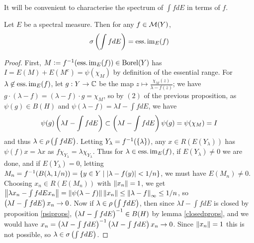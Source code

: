 \documentclass[10pt]{amsart}
\begin{document}
It will be convenient to characterise the spectrum of $\int f dE$ in terms of $f$. %
\begin{proposition}\label{essimspec} %
    Let $E$ be a spectral measure. Then for any $f \in \mathcal{M}(Y)$,
    $$
        \sigma\left(  \int f dE  \right) = \operatorname{ess.im}_E(f)
    $$
\end{proposition}
\begin{proof}
    First, $M \vcentcolon= f^{-1}(\operatorname{ess.im}_E(f)) \in \operatorname{Borel}(Y)$ has $I = E(M) + E(M^c) = \psi(\chi_M)$ by definition of the essential range. For $\lambda \not\in \operatorname{ess.im}_E(f)$, let $g : Y \to \mathbb{C}$ be the map $z \mapsto \frac{\chi_M(z)}{\lambda - f(z)}$; we have $g \cdot (\lambda - f) = (\lambda - f) \cdot g = \chi_M$, so by $(2)$ of the previous proposition, as $\psi(g) \in B(H)$ and $\psi(\lambda - f) = \lambda I - \int f dE$, we have
    $$
        \psi(g)\left(  \lambda I - \int f dE  \right) \subset \left(  \lambda I - \int f dE  \right)\psi(g) = \psi(\chi_M) = I
    $$ %
    and thus $\lambda \in \rho\left(  \int f dE  \right)$. Letting $Y_\lambda = f^{-1}(\left\{  \lambda  \right\})$, any $x \in R(E(Y_\lambda))$ has $\psi(f)x = \lambda x$ as $f\chi_{Y_\lambda} = \lambda\chi_{Y_\lambda}$. Thus for $\lambda \in \operatorname{ess.im}_E(f)$, if $E(Y_\lambda) \neq 0$ we are done, and if $E(Y_\lambda) = 0$, letting $M_n = f^{-1}(B(\lambda, 1/n)) = \left\{  y \in Y \mid \left| \lambda - f(y) \right| < 1/n  \right\}$, we must have $E(M_n) \neq 0$. Choosing $x_n \in R(E(M_n))$ with $\left\| x_n \right\| = 1$, we get $\left\| \lambda x_n - \int f dE x_n \right\| = \left\| \psi(\lambda - f) \right\|\left\| x_n \right\| \leq \left\| \lambda - f \right\|_\infty \leq 1/n$, so $\left(  \lambda I - \int f dE  \right)x_n \to 0$. Now if $\lambda \in \rho\left(  \int f dE  \right)$, then since $\lambda I - \int f dE$ is closed by proposition \ref{psiprops}, $\left(  \lambda I - \int f dE  \right)^{-1} \in B(H)$ by lemma \ref{closedprops}, and we would have $x_n = \left(  \lambda I - \int f dE  \right)^{-1}\left(  \lambda I - \int f dE  \right)x_n \to 0$. Since $\left\| x_n \right\| = 1$ this is not possible, so $\lambda \in \sigma\left(  \int f dE  \right)$.
\end{proof}
\end{document}
